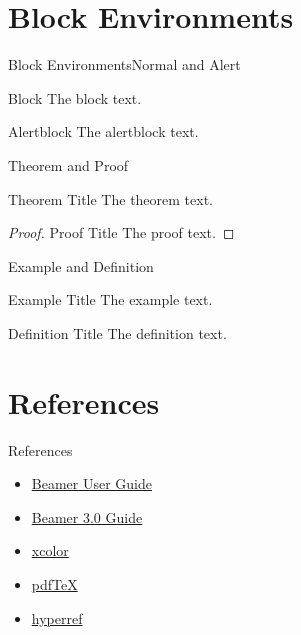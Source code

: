 \section{Block Environments}
\begin{frame}{Block Environments}{Normal and Alert}
\begin{block}{Block}
The block text.
\end{block}
\begin{alertblock}{Alertblock}
The alertblock text.
\end{alertblock}
\end{frame}
\begin{frame}{Theorem and Proof}
\begin{theorem}{Theorem Title}
The theorem text.
\end{theorem}
\begin{proof}{Proof Title}
The proof text.
\end{proof}
\end{frame}
\begin{frame}{Example and Definition}
\begin{example}{Example Title}
The example text.
\end{example}
\begin{definition}{Definition Title}
The definition text.
\end{definition}
\end{frame}
\section{References}
\begin{frame}{References}
\begin{itemize}
\item \href{http://www.ctan.org/tex-archive/macros/latex/contrib/beamer/doc/beameruserguide.pdf}{Beamer User Guide}
\item \href{http://faq.ktug.or.kr/wiki/uploads/beamer_guide.pdf}{Beamer 3.0 Guide}
\item \href{ftp://ftp.dante.de/pub/tex/macros/latex/contrib/xcolor/xcolor.pdf}{xcolor}
\item \href{http://www.tug.org/texmf-dist/doc/pdftex/manual/pdftex-a.pdf}{pdf\TeX}
\item \href{http://www.tug.org/applications/hyperref/ftp/doc/manual.pdf}{hyperref}
\end{itemize}
\end{frame}
